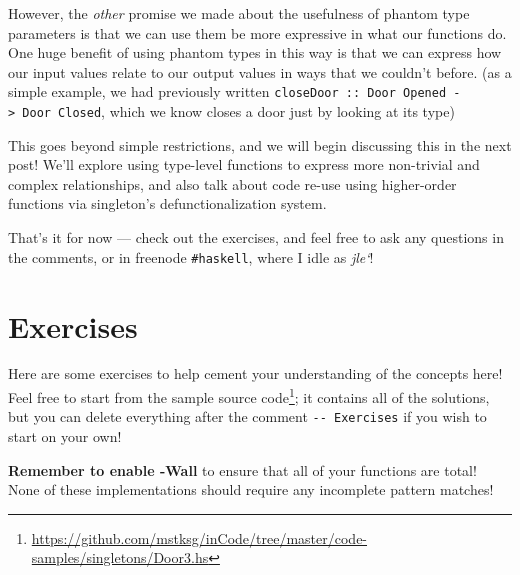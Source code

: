 \documentclass[]{article}
\renewcommand{\href}[2]{#2\footnote{\url{#1}}}
\begin{document}
However, the \emph{other} promise we made about the usefulness of phantom type
parameters is that we can use them be more expressive in what our functions do.
One huge benefit of using phantom types in this way is that we can express how
our input values relate to our output values in ways that we couldn't before.
(as a simple example, we had previously written
\texttt{closeDoor\ ::\ Door\ \textquotesingle{}Opened\ -\textgreater{}\ Door\ \textquotesingle{}Closed},
which we know closes a door just by looking at its type)

This goes beyond simple restrictions, and we will begin discussing this in the
next post! We'll explore using type-level functions to express more non-trivial
and complex relationships, and also talk about code re-use using higher-order
functions via singleton's defunctionalization system.

That's it for now --- check out the exercises, and feel free to ask any
questions in the comments, or in freenode \texttt{\#haskell}, where I idle as
\emph{jle`}!

\hypertarget{exercises}{%
\section{Exercises}\label{exercises}}

Here are some exercises to help cement your understanding of the concepts here!
Feel free to start from
\href{https://github.com/mstksg/inCode/tree/master/code-samples/singletons/Door3.hs}{the
sample source code}; it contains all of the solutions, but you can delete
everything after the comment \texttt{-\/-\ Exercises} if you wish to start on
your own!

\textbf{Remember to enable -Wall} to ensure that all of your functions are
total! None of these implementations should require any incomplete pattern
matches!
\end{document}
